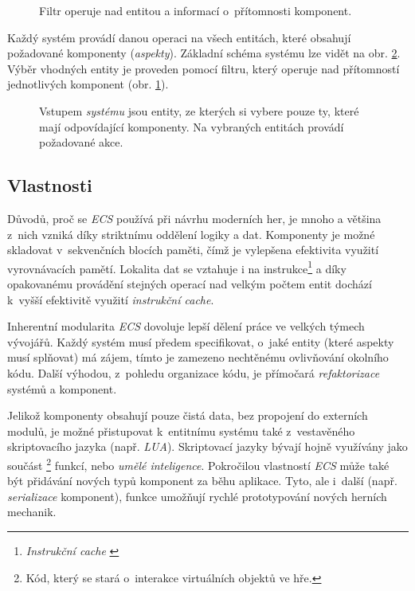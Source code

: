\begin{figure}[H]
	\centering
	\caption{Filtr operuje nad entitou a informací o~přítomnosti komponent.}
	\label{Fig:ECSFilter}
\end{figure}

Každý systém provádí danou operaci na všech entitách, které obsahují požadované komponenty (\emph{aspekty}). Základní schéma systému lze vidět na obr. \ref{Fig:ECSSystem}. Výběr vhodných entity je proveden pomocí filtru, který operuje nad přítomností jednotlivých komponent (obr. \ref{Fig:ECSFilter}).

\begin{figure}[H]
	\centering
	\caption{Vstupem \emph{systému} jsou entity, ze kterých si vybere pouze ty, které mají odpovídající komponenty. Na vybraných entitách provádí požadované akce.}
	\label{Fig:ECSSystem}
\end{figure}

\subsection{Vlastnosti}

Důvodů, proč se \emph{ECS} používá při návrhu moderních her, je mnoho a většina z~nich vzniká díky striktnímu oddělení logiky a dat. Komponenty je možné skladovat v~sekvenčních blocích paměti, čímž je vylepšena efektivita využití vyrovnávacích pamětí. Lokalita dat se vztahuje i na instrukce\footnote{\emph{Instrukční cache} \cite{CpuMemoryGap, InstrAreData}} a díky opakovanému provádění stejných operací nad velkým počtem entit dochází k~vyšší efektivitě využití \emph{instrukční cache}. 

Inherentní modularita \emph{ECS} dovoluje lepší dělení práce ve velkých týmech vývojářů. Každý systém musí předem specifikovat, o~jaké entity (které aspekty musí splňovat) má zájem, tímto je zamezeno nechtěnému ovlivňování okolního kódu. Další výhodou, z~pohledu organizace kódu, je přímočará \emph{refaktorizace} systémů a komponent.

Jelikož komponenty obsahují pouze čistá data, bez propojení do externích modulů, je možné přistupovat k~entitnímu systému také z~vestavěného skriptovacího jazyka (např. \emph{LUA}). Skriptovací jazyky bývají hojně využívány jako součást \footnote{Kód, který se stará o~interakce virtuálních objektů ve hře.} funkcí, nebo \emph{umělé inteligence}. Pokročilou vlastností \emph{ECS} může také být přidávání nových typů komponent za běhu aplikace. Tyto, ale i~další (např. \emph{serializace} komponent), funkce umožňují rychlé prototypování nových herních mechanik.

